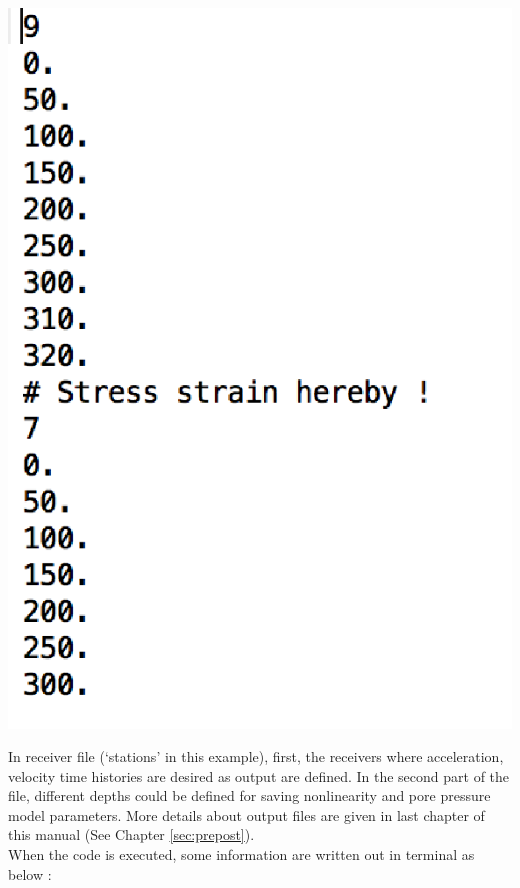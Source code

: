 \begin{center}
\leavevmode
\includegraphics [scale=0.75] {figures/stations.eps} 
\label{stat} 
\vspace{1cm}
\end{center}

In receiver file (‘stations’ in this example), first, the receivers where acceleration, velocity time histories are desired as output are defined. In the second part of the file, different depths could be defined for saving nonlinearity and pore pressure model parameters. More details about output files are given in last chapter of this manual (See Chapter \ref{sec:prepost}). \\

When the code is executed, some information are written out in terminal as below : \\

